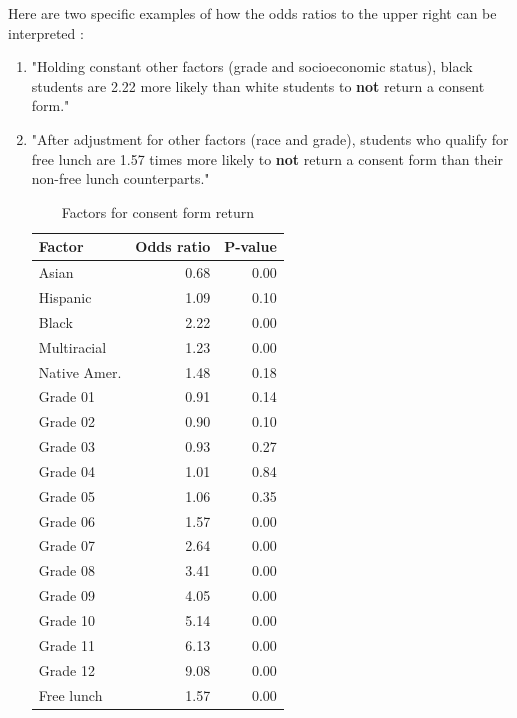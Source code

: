 \begin{multicols}{2}
Here are two specific examples of how the odds ratios to the upper right can be interpreted :\begin{enumerate}
\item "Holding constant other factors (grade and socioeconomic status), black students are 2.22 more likely than white students to  \textbf{not} return a consent form."
\item "After adjustment for other factors (race and grade), students who qualify for free lunch are 1.57 times more likely to \textbf{not} return a consent form than their non-free lunch counterparts."


\begin{table}[H]
\begin{table}[ht]
\centering
{\small
\begin{tabular}{lrr}
  \hline
Factor & Odds ratio & P-value \\ 
  \hline
Asian & 0.68 & 0.00 \\ 
  Hispanic & 1.09 & 0.10 \\ 
  Black & 2.22 & 0.00 \\ 
  Multiracial & 1.23 & 0.00 \\ 
  Native Amer. & 1.48 & 0.18 \\ 
  Grade 01 & 0.91 & 0.14 \\ 
  Grade 02 & 0.90 & 0.10 \\ 
  Grade 03 & 0.93 & 0.27 \\ 
  Grade 04 & 1.01 & 0.84 \\ 
  Grade 05 & 1.06 & 0.35 \\ 
  Grade 06 & 1.57 & 0.00 \\ 
  Grade 07 & 2.64 & 0.00 \\ 
  Grade 08 & 3.41 & 0.00 \\ 
  Grade 09 & 4.05 & 0.00 \\ 
  Grade 10 & 5.14 & 0.00 \\ 
  Grade 11 & 6.13 & 0.00 \\ 
  Grade 12 & 9.08 & 0.00 \\ 
  Free lunch & 1.57 & 0.00 \\ 
   \hline
\end{tabular}
}
\caption{Factors for consent form return} 
\end{table}\end{table}


\end{enumerate}
\end{multicols}
